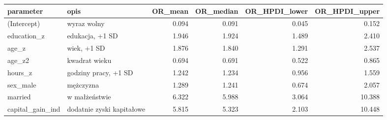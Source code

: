 \begin{tabular}{llrrrr}
  \hline
parameter & opis & OR\_mean & OR\_median & OR\_HPDI\_lower & OR\_HPDI\_upper \\ 
  \hline
(Intercept) & wyraz wolny & 0.094 & 0.091 & 0.045 & 0.152 \\ 
  education\_z & edukacja, +1 SD & 1.946 & 1.924 & 1.489 & 2.410 \\ 
  age\_z & wiek, +1 SD & 1.876 & 1.840 & 1.291 & 2.537 \\ 
  age\_z2 & kwadrat wieku & 0.694 & 0.691 & 0.522 & 0.865 \\ 
  hours\_z & godziny pracy, +1 SD & 1.242 & 1.234 & 0.956 & 1.559 \\ 
  sex\_male & mężczyzna & 1.289 & 1.241 & 0.674 & 2.057 \\ 
  married & w małżeństwie & 6.322 & 5.988 & 3.064 & 10.388 \\ 
  capital\_gain\_ind & dodatnie zyski kapitałowe & 5.815 & 5.323 & 2.103 & 10.448 \\ 
   \hline
\end{tabular}
